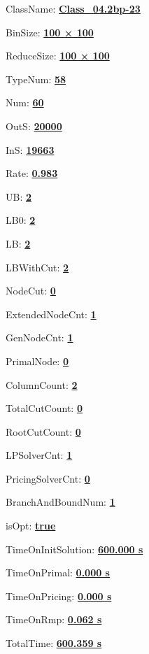 \documentclass[11pt]{article}
\begin{document}
\pagestyle{empty}


ClassName: \underline{\textbf{Class_04.2bp-23}}
\par
BinSize: \underline{\textbf{100 × 100}}
\par
ReduceSize: \underline{\textbf{100 × 100}}
\par
TypeNum: \underline{\textbf{58}}
\par
Num: \underline{\textbf{60}}
\par
OutS: \underline{\textbf{20000}}
\par
InS: \underline{\textbf{19663}}
\par
Rate: \underline{\textbf{0.983}}
\par
UB: \underline{\textbf{2}}
\par
LB0: \underline{\textbf{2}}
\par
LB: \underline{\textbf{2}}
\par
LBWithCut: \underline{\textbf{2}}
\par
NodeCut: \underline{\textbf{0}}
\par
ExtendedNodeCnt: \underline{\textbf{1}}
\par
GenNodeCnt: \underline{\textbf{1}}
\par
PrimalNode: \underline{\textbf{0}}
\par
ColumnCount: \underline{\textbf{2}}
\par
TotalCutCount: \underline{\textbf{0}}
\par
RootCutCount: \underline{\textbf{0}}
\par
LPSolverCnt: \underline{\textbf{1}}
\par
PricingSolverCnt: \underline{\textbf{0}}
\par
BranchAndBoundNum: \underline{\textbf{1}}
\par
isOpt: \underline{\textbf{true}}
\par
TimeOnInitSolution: \underline{\textbf{600.000 s}}
\par
TimeOnPrimal: \underline{\textbf{0.000 s}}
\par
TimeOnPricing: \underline{\textbf{0.000 s}}
\par
TimeOnRmp: \underline{\textbf{0.062 s}}
\par
TotalTime: \underline{\textbf{600.359 s}}
\par
\newpage
\end{document}
